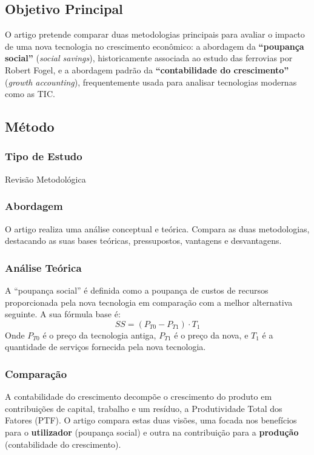 \documentclass[12pt]{article}
\begin{document}
\subsection*{Objetivo Principal}
O artigo pretende comparar duas metodologias principais para avaliar o impacto de uma nova tecnologia no crescimento econômico: a abordagem da \textbf{“poupança social”} (\textit{social savings}), historicamente associada ao estudo das ferrovias por Robert Fogel, e a abordagem padrão da \textbf{“contabilidade do crescimento”} (\textit{growth accounting}), frequentemente usada para analisar tecnologias modernas como as TIC.


\subsection*{Método}

\subsubsection*{Tipo de Estudo}
Revisão Metodológica

\subsubsection*{Abordagem}
O artigo realiza uma análise conceptual e teórica. Compara as duas metodologias, destacando as suas bases teóricas, pressupostos, vantagens e desvantagens.

\subsubsection*{Análise Teórica}
A “poupança social” é definida como a poupança de custos de recursos proporcionada pela nova tecnologia em comparação com a melhor alternativa seguinte. A sua fórmula base é:
\[
SS = (P_{T0} - P_{T1}) \cdot T_1
\]
Onde $P_{T0}$ é o preço da tecnologia antiga, $P_{T1}$ é o preço da nova, e $T_1$ é a quantidade de serviços fornecida pela nova tecnologia.

\subsubsection*{Comparação}
A contabilidade do crescimento decompõe o crescimento do produto em contribuições de capital, trabalho e um resíduo, a Produtividade Total dos Fatores (PTF). O artigo compara estas duas visões, uma focada nos benefícios para o \textbf{utilizador} (poupança social) e outra na contribuição para a \textbf{produção} (contabilidade do crescimento).
\end{document}
